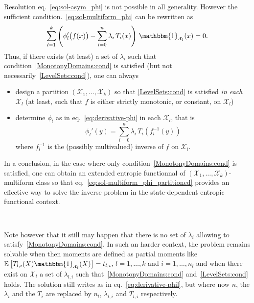 \documentclass[english,sort&compress]{elsarticle}
\theoremstyle{definition}
\theoremstyle{plain}
\theoremstyle{plain}
\def\X{\mathcal{X}}
\def\un{\mathbbm{1}}
\newcommand{\Esp}[1]{\mathbb{E}\left[ #1 \right]}
\begin{document}
Resolution  eq.~\eqref{eq:sol-asym_phi}  is  not  possible  in  all  generality.
However the sufficient  condition.~\eqref{eq:sol-multiform_phi} can be rewritten
as
%
\begin{equation}\label{eq:sol-multiform_phi_partitioned}
\sum_{l=1}^k \left( \phi_l'\big(f(x)\big) - \sum_{i=0}^n \lambda_i \, T_i(x)
\right) \, \un_{\X_l}(x) = 0.
\end{equation}
%
Thus,   if  there   exists  (at   least)  a   set  of   $\lambda_i$   such  that
condition~\ref{MonotonyDomains:cond}       is      satisfied       (but      not
necessarily~\ref{LevelSets:cond}), one can always
%
\begin{itemize}
\item design  a partition  $(\X_1,\ldots,\X_k)$ so that  \ref{LevelSets:cond} is
  satisfied {\em  in each $\X_l$}  (at least, such  that $f$ is  either strictly
  monotonic, or constant, on $\X_l$)
\item  determine $\phi_l$  as in  eq.~\eqref{eq:derivative-phi} in  each $\X_l$,
  that is
    \begin{equation}\label{eq:derivative-phil}
    \phi_l'(y) = \sum_{i=0}^n \lambda_i \, T_i\!\left(f_l^{-1}(y)\right)
    \end{equation}
    where $f_l^{-1}$ is the (possibly multivalued) inverse of $f$ on $\X_l$.
\end{itemize}

In      a     conclusion,      in     the          case      where     only
condition~\ref{MonotonyDomains:cond}  is satisfied, one  can obtain  an extended
entropic   functionnal   of   $(\X_1,\ldots,\X_k)$-multiform   class   so   that
eq.~\eqref{eq:sol-multiform_phi_partitioned} provides an  effective way to solve
the inverse problem in the state-dependent entropic functional context.

\

Note  however that  it still  may happen  that there  is no  set  of $\lambda_i$
allowing to satisfy~\ref{MonotonyDomains:cond}.  In  such an harder context, the
problem remains solvable  when then moments are defined  as partial moments like
$\Esp{T_{l,i}(X) \un_{\X_l}(X)} =  t_{l,i}$, $l = 1 ,  \ldots , k$ and $i  = 1 ,
\ldots  , n_l$ and  when there  exist on  $\X_l$ a  set of  $\lambda_{l,i}$ such
that~\ref{MonotonyDomains:cond}  and~\ref{LevelSets:cond}  holds.  The  solution
still  writes  as in  eq.~\eqref{eq:derivative-phil},  but  where  now $n$,  the
$\lambda_i$ and the  $T_i$ are replaced by $n_l$,  $\lambda_{l,i}$ and $T_{l,i}$
respectively.
\end{document}
